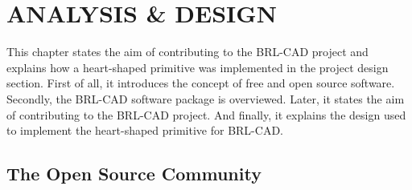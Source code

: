 \chapter{ANALYSIS \& DESIGN}
\label{Analysis \& Design}

\hspace{30} This chapter states the aim of   contributing   to   the BRL-­CAD project  
and   explains   how a   heart-shaped   primitive was implemented in the project design  
section.   First of all,   it   introduces   the   concept   of   free   and   open   source   software. Secondly,   the BRL-­CAD   software   package is overviewed. Later, it states the   aim   of   contributing   to   the   BRL-­CAD   project.   And finally,  it explains the   design used to implement the heart-­shaped primitive for BRL-CAD.

\section{The Open Source Community}

